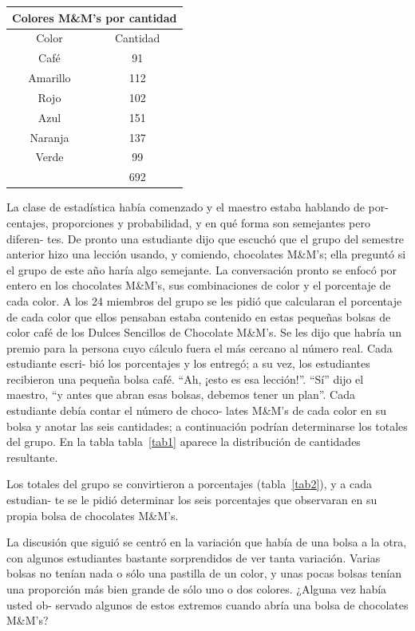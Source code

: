 \documentclass[10pt,twoside]{article}
\begin{document}
\begin{minipage}{0.35\textwidth}
\begin{tabular}{c|c}\label{tab1}
\multicolumn{2}{c}{Colores M\&M's por cantidad} \\ \hline
Color & Cantidad \\ \hline
Café & 91 \\ 
Amarillo & 112 \\ 
Rojo & 102 \\ 
Azul & 151 \\ 
Naranja & 137 \\ 
Verde & 99 \\ \cline{2-2}
 & 692 \\ 
\hline 
\end{tabular}
\end{minipage}\hfill
\begin{minipage}{.6\textwidth}
La clase de estadística había comenzado y el maestro estaba hablando de por-
centajes, proporciones y probabilidad, y en qué forma son semejantes pero diferen-
tes. De pronto una estudiante dijo que escuchó que el grupo del semestre anterior
hizo una lección usando, y comiendo, chocolates M\&M’s; ella preguntó si el grupo
de este año haría algo semejante. La conversación pronto se enfocó por entero en
los chocolates M\&M’s, sus combinaciones de color y el porcentaje de cada color. A
los 24 miembros del grupo se les pidió que calcularan el porcentaje de cada color
que ellos pensaban estaba contenido en estas pequeñas bolsas de color café de los
Dulces Sencillos de Chocolate M\&M’s. Se les dijo que habría un premio para la
persona cuyo cálculo fuera el más cercano al número real. Cada estudiante escri-
bió los porcentajes y los entregó; a su vez, los estudiantes recibieron una pequeña
bolsa café. “Ah, ¡esto es esa lección!”. “Sí” dijo el maestro, “y antes que abran esas
bolsas, debemos tener un plan”. Cada estudiante debía contar el número de choco-
lates M\&M's de cada color en su bolsa y anotar las seis cantidades; a continuación
podrían determinarse los totales del grupo. En la tabla tabla~\ref{tab1} aparece la distribución
de cantidades resultante.
\end{minipage} 

Los totales del grupo se convirtieron a porcentajes (tabla~\ref{tab2}), y a cada estudian-
te se le pidió determinar los seis porcentajes que observaran en su propia bolsa de
chocolates M\&M's.

La discusión que siguió se centró en la variación que había de una bolsa a la
otra, con algunos estudiantes bastante sorprendidos de ver tanta variación. Varias
bolsas no tenían nada o sólo una pastilla de un color, y unas pocas bolsas tenían una
proporción más bien grande de sólo uno o dos colores. ¿Alguna vez había usted ob-
servado algunos de estos extremos cuando abría una bolsa de chocolates M\&M's?
\end{document}
